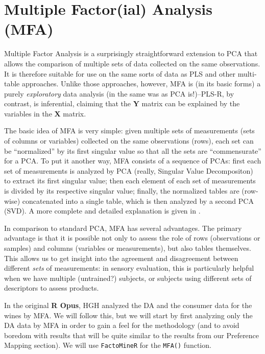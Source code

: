 \documentclass[
]{book}
\begin{document}
\chapter{Multiple Factor(ial) Analysis (MFA)}\label{multiple-factorial-analysis-mfa}

Multiple Factor Analysis \citep[MFA: sometimes called Multiple Factor\emph{ial} Analysis, to distinguish from the ``Factor Analysis'' approaches related to Exploratory and Confirmatory Factor Analysis, see][]{rencherMethods2002} is a surprisingly straightforward extension to PCA that allows the comparison of multiple sets of data collected on the same observations. It is therefore suitable for use on the same sorts of data as PLS and other multi-table approaches. Unlike those approaches, however, MFA is (in its basic forms) a purely \emph{exploratory} data analysis (in the same was as PCA is!)--PLS-R, by contrast, is inferential, claiming that the \(\mathbf{Y}\) matrix can be explained by the variables in the \(\mathbf{X}\) matrix.

The basic idea of MFA is very simple: given multiple sets of measurements (sets of columns or variables) collected on the same observations (rows), each set can be ``normalized'' by its first singular value so that all the sets are ``commensurate'' for a PCA. To put it another way, MFA consists of a sequence of PCAs: first each set of measurements is analyzed by PCA (really, Singular Value Decompositon) to extract its first singular value; then each element of each set of measurements is divided by its respective singular value; finally, the normalized tables are (row-wise) concatenated into a single table, which is then analyzed by a second PCA (SVD). A more complete and detailed explanation is given in \citet{abdiMultiple2013}.

In comparison to standard PCA, MFA has several advantages. The primary advantage is that it is possible not only to assess the role of rows (observations or samples) and columns (variables or measurements), but also tables themselves. This allows us to get insight into the agreement and disagreement between different \emph{sets} of measurements: in sensory evaluation, this is particularly helpful when we have multiple (untrained?) subjects, or subjects using different sets of descriptors to assess products.

In the original \textbf{R Opus}, HGH analyzed the DA and the consumer data for the wines by MFA. We will follow this, but we will start by first analyzing only the DA data by MFA in order to gain a feel for the methodology (and to avoid boredom with results that will be quite similar to the results from our Preference Mapping section). We will use \texttt{FactoMineR} for the \texttt{MFA()} function.
\end{document}
